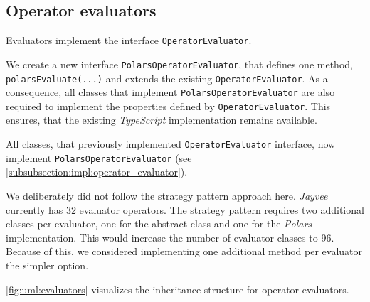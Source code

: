 \subsection{Operator evaluators}
\label{subsection:arch:operator_evaluators}
Evaluators implement the interface \Verb|OperatorEvaluator|.

We create a new interface \Verb|PolarsOperatorEvaluator|, that defines one method, \Verb|polarsEvaluate(...)| and extends the existing \Verb|OperatorEvaluator|.
As a consequence, all classes that implement \Verb|PolarsOperatorEvaluator| are also required to implement the properties defined by \Verb|OperatorEvaluator|.
This ensures, that the existing \emph{TypeScript} implementation remains available.

All classes, that previously implemented \Verb|OperatorEvaluator| interface, now implement \Verb|PolarsOperatorEvaluator| (see \autoref{subsubsection:impl:operator_evaluator}).

We deliberately did not follow the strategy pattern approach here.
\emph{Jayvee} currently has 32 evaluator operators.
The strategy pattern requires two additional classes per evaluator, one for the abstract class and one for the \emph{Polars} implementation.
This would increase the number of evaluator classes to 96.
Because of this, we considered implementing one additional method per evaluator the simpler option.

\autoref{fig:uml:evaluators} visualizes the inheritance structure for operator evaluators.

